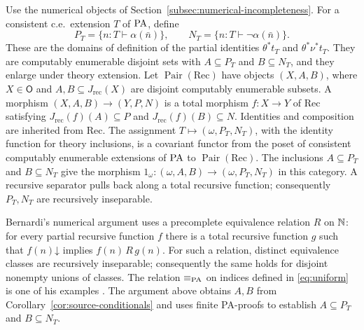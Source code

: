 Use the numerical objects of Section~\ref{subsec:numerical-incompleteness}.
For a consistent c.e.\ extension $T$ of $\mathrm{PA}$, define
\[
 P_T=\{n:T\vdash\alpha(\bar n)\},\qquad
 N_T=\{n:T\vdash\neg\alpha(\bar n)\}.
\]
These are the domains of definition of the partial identities
$\theta^*t_T$ and $\theta^*\nu^*t_T$.
They are computably enumerable disjoint sets with $A\subseteq P_T$
and $B\subseteq N_T$, and they enlarge under theory extension.
Let $\operatorname{Pair}(\mathrm{Rec})$ have objects $(X,A,B)$,
where $X\in\mathsf O$ and $A,B\subseteq J_{\mathrm{rec}}(X)$
are disjoint computably enumerable subsets.
A morphism $(X,A,B)\to(Y,P,N)$ is a total morphism $f:X\to Y$
of $\mathrm{Rec}$ satisfying $J_{\mathrm{rec}}(f)(A)\subseteq P$ and
$J_{\mathrm{rec}}(f)(B)\subseteq N$. Identities and composition are inherited
from $\mathrm{Rec}$. The assignment
$T\mapsto(\omega,P_T,N_T)$, with the identity function for theory
inclusions, is a covariant functor from the poset of consistent
computably enumerable extensions of $\mathrm{PA}$ to
$\operatorname{Pair}(\mathrm{Rec})$.
The inclusions $A\subseteq P_T$ and $B\subseteq N_T$ give the morphism
$1_\omega:(\omega,A,B)\to(\omega,P_T,N_T)$ in this category.
A recursive separator pulls back along a total recursive function;
consequently $P_T,N_T$ are recursively inseparable.

Bernardi's numerical argument uses a precomplete equivalence
relation $R$ on $\mathbb N$: for every partial recursive function $f$
there is a total recursive function $g$ such that
$f(n)\mathord\downarrow$ implies $f(n)\,R\,g(n)$.
For such a relation, distinct equivalence classes are recursively
inseparable; consequently the same holds for disjoint nonempty
unions of classes. The relation $\equiv_{\mathrm{PA}}$ on indices defined
in \eqref{eq:uniform} is one of his examples
\cite[pp.~125--126]{Bernardi}.
The argument above obtains $A,B$ from
Corollary~\ref{cor:source-conditionals} and uses finite PA-proofs to
establish $A\subseteq P_T$ and $B\subseteq N_T$.
